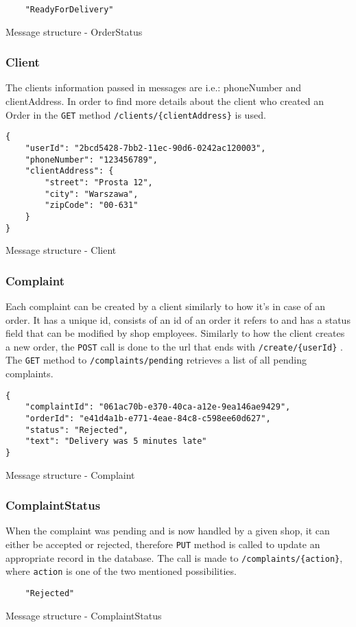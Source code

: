 \documentclass[../main.tex]{subfiles}
\begin{document}
\begin{listing}[htp]
\begin{verbatim}
    "ReadyForDelivery"
\end{verbatim}
\caption{Message structure - OrderStatus}
\end{listing}


\subsubsection{Client}
The clients information passed in messages are i.e.: phoneNumber and clientAddress.
In order to find more details about the client who created an Order in the \texttt{GET} method \texttt{/clients/\{clientAddress\}} is used.

\begin{listing}[htp]
\begin{verbatim}
{
    "userId": "2bcd5428-7bb2-11ec-90d6-0242ac120003",
    "phoneNumber": "123456789",
    "clientAddress": {
        "street": "Prosta 12",
        "city": "Warszawa",
        "zipCode": "00-631"
    }
}
\end{verbatim}
\caption{Message structure - Client}
\end{listing}

\subsubsection{Complaint}
Each complaint can be created by a client similarly to how it's in case of an order. It has a unique id, consists of an id of an order it refers to and has a status field that can be modified by shop employees. Similarly to how the client creates a new order, the \texttt{POST} call is done to the url that ends with \texttt{/create/\{userId\}} . The \texttt{GET} method to \texttt{/complaints/pending} retrieves a list of all pending complaints.

\begin{listing}[htp]
\begin{verbatim}
{
    "complaintId": "061ac70b-e370-40ca-a12e-9ea146ae9429",
    "orderId": "e41d4a1b-e771-4eae-84c8-c598ee60d627",
    "status": "Rejected",
    "text": "Delivery was 5 minutes late"
}
\end{verbatim}
\caption{Message structure - Complaint}
\end{listing}

\subsubsection{ComplaintStatus}
When the complaint was pending and is now handled by a given shop, it can either be accepted or rejected, therefore \texttt{PUT} method is called to update an appropriate record in the database. The call is made to \texttt{/complaints/\{action\}}, where \texttt{action} is one of the two mentioned possibilities.

\begin{listing}[htp]
\begin{verbatim}
    "Rejected"
\end{verbatim}
\caption{Message structure - ComplaintStatus}
\end{listing}
\end{document}
